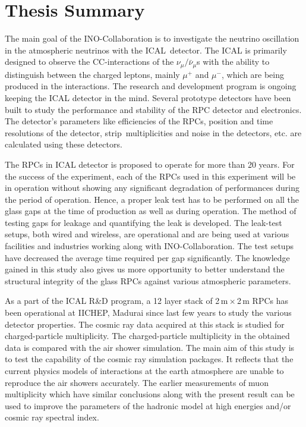 
\chapter{Thesis Summary}

The main goal of the INO-Collaboration is to investigate the neutrino
oscillation in the atmospheric neutrinos with the ICAL~detector.
The ICAL is primarily designed to observe the CC-interactions of
the $\nu_{\mu}/\bar{\nu}_{\mu}$s with the ability to distinguish between
the charged leptons, mainly $\mu^{+}$ and $\mu^{-}$,
which are being produced in the interactions. The research and
development program is ongoing keeping the ICAL detector in the mind.
Several prototype detectors have been built to study the performance
and stability of the RPC detector and electronics. The detector's
parameters like efficiencies of the RPCs, position and time
resolutions of the detector, strip~multiplicities and noise
in the detectors, etc. are calculated using these detectors.

The RPCs in ICAL detector is proposed to operate for more than 20
years. For the success of the experiment, each of the RPCs used in
this experiment will be in operation without showing any significant
degradation of performances during the period of operation. Hence, a
proper leak test has to be performed on all the glass gaps at the time
of production as well as during operation.
The method of testing gaps for leakage and quantifying the leak is
developed. The leak-test setups, both wired and wireless, are
operational and are being used at various facilities and industries
working along with INO-Collaboration. The test setups have decreased
the average time required per gap significantly. The knowledge gained
in this study also gives us more opportunity to better understand the
structural integrity of the glass RPCs against various atmospheric
parameters.

As a part of the ICAL R\&D program, a 12 layer stack of
2\,m\,$\times$\,2\,m RPCs has been operational at IICHEP, Madurai
since last few years to study the various detector properties. The
cosmic ray data acquired at this stack is studied for charged-particle
multiplicity. The charged-particle multiplicity in the obtained data
is compared with the air shower simulation. The main aim of this study
is to test the capability of the cosmic ray simulation packages. It
reflects that the current physics models of interactions at the earth
atmosphere are unable to reproduce the air showers accurately. The
earlier measurements of muon multiplicity which have similar
conclusions along with the present result can be used to improve the
parameters of the hadronic model at high energies and/or cosmic ray
spectral index.

